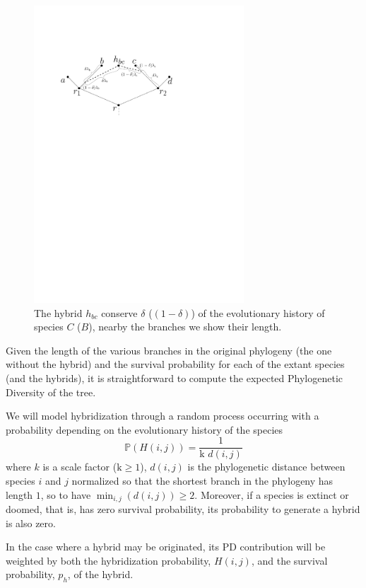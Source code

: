 \documentclass[12pt,a4paper]{report}
\begin{document}
\begin{figure}[h]
	\centering
		\includegraphics[width=0.7\textwidth]{images/hybridbcdeltalambda}
		\caption{The hybrid $h_{bc}$ conserve $\delta$ ($(1-\delta)$) of the evolutionary history of species $C$ ($B$), nearby the branches we show their length.}
		\label{fig:hybridbcdeltalambda}
\end{figure}

Given the length of the various branches in the original phylogeny (the one without the hybrid) and the survival probability for each of the extant species (and the hybrids), it is straightforward to compute the expected Phylogenetic Diversity of the tree.

We will model hybridization through a random process occurring with a probability depending on the evolutionary history of the species \[\mathbb{P}(H(i,j))=\frac{1}{\mbox{k } d(i,j)}\] where $k$ is a scale factor ($\mbox{k}\geq 1$), $d(i,j)$ is the phylogenetic distance between species $i$ and $j$ normalized so that the shortest branch in the phylogeny has length $1$, so to have $\min_{i,j}(d(i,j)) \geq 2$. Moreover, if a species is extinct or doomed, that is, has zero survival probability, its probability to generate a hybrid is also zero.

In the case where a hybrid may be originated, its PD contribution will be weighted by both the hybridization probability, $H(i,j)$, and the survival probability, $p_h$, of the hybrid. 
\end{document}
